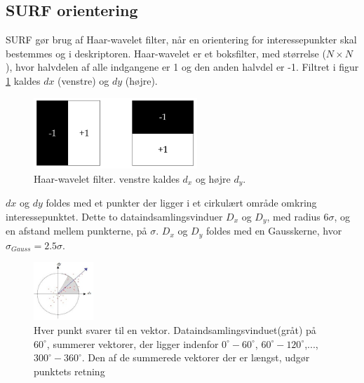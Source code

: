 \subsection{SURF orientering}
SURF gør brug af Haar-wavelet filter, når en orientering for interessepunkter skal bestemmes og i deskriptoren. Haar-wavelet er et boksfilter, med størrelse ($N\times N$), hvor halvdelen af alle indgangene er 1 og den anden halvdel er -1. Filtret i figur \ref{fig:haarwavelet} kaldes $dx$ (venstre) og $dy$ (højre).
\begin{figure}[H]
    \centering
    \includegraphics[width=0.55\textwidth]{fig/haarwavelet.png}
     \vspace{-1em}
    \begin{center}    
       \caption{Haar-wavelet filter. venstre kaldes $d_x$ og højre $d_y$.}
    \label{fig:haarwavelet}
     \end{center}
     \vspace{-2.5em}
  \end{figure} \noindent
$dx$ og $dy$ foldes med et punkter der ligger i et cirkulært område omkring interessepunktet. Dette to dataindsamlingsvinduer $D_x$ og $D_y$, med radius $6\sigma$, og en afstand mellem punkterne, på $\sigma$. $D_x$ og $D_y$ foldes med en Gausskerne, hvor $\sigma_{Gauss} = 2.5\sigma$.
\begin{figure}[H]
    \centering
    \includegraphics[width=0.2\textwidth]{fig/surforientation.jpg}
     \vspace{-1em}
    \begin{center}    
       \caption{Hver punkt svarer til en vektor. Dataindsamlingsvinduet(gråt) på $60^{\circ}$, summerer vektorer, der ligger indenfor $0^{\circ}-60^{\circ}$, $60^{\circ}-120^{\circ}$,..., $300^{\circ}-360^{\circ}$. Den af de summerede vektorer der er længst, udgør punktets retning}
    \label{fig:surforientation}
     \end{center}
     \vspace{-2.5em}
  \end{figure} \noindent
